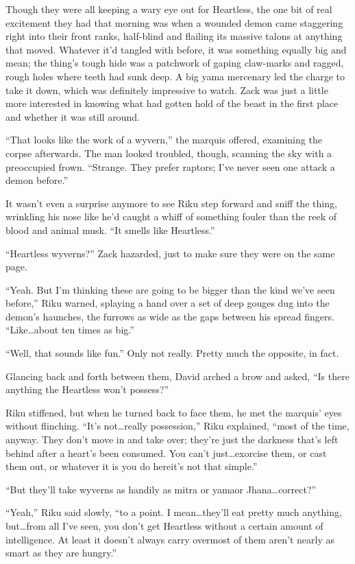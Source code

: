 Though they were all keeping a wary eye out for Heartless, the one bit of real excitement they had that morning was when a wounded demon came staggering right into their front ranks, half-blind and flailing its massive talons at anything that moved. Whatever it'd tangled with before, it was something equally big and mean; the thing's tough hide was a patchwork of gaping claw-marks and ragged, rough holes where teeth had sunk deep. A big yama mercenary led the charge to take it down, which was definitely impressive to watch. Zack was just a little more interested in knowing what had gotten hold of the beast in the first place and whether it was still around.

``That looks like the work of a wyvern,'' the marquis offered, examining the corpse afterwards. The man looked troubled, though, scanning the sky with a preoccupied frown. ``Strange. They prefer raptors; I've never seen one attack a demon before.''

It wasn't even a surprise anymore to see Riku step forward and sniff the thing, wrinkling his nose like he'd caught a whiff of something fouler than the reek of blood and animal musk. ``It smells like Heartless.''

``Heartless wyverns?'' Zack hazarded, just to make sure they were on the same page.

``Yeah. But I'm thinking these are going to be bigger than the kind we've seen before,'' Riku warned, splaying a hand over a set of deep gouges dug into the demon's haunches, the furrows as wide as the gaps between his spread fingers. ``Like\ldots about ten times as big.''

``Well, that sounds like fun.'' Only not really. Pretty much the opposite, in fact.

Glancing back and forth between them, David arched a brow and asked, ``Is there anything the Heartless won't possess?''

Riku stiffened, but when he turned back to face them, he met the marquis' eyes without flinching. ``It's not\ldots really possession,'' Riku explained, ``most of the time, anyway. They don't move in and take over; they're just the darkness that's left behind after a heart's been consumed. You can't just\ldots exorcise them, or cast them out, or whatever it is you do here\textemdash it's not that simple.''

``But they'll take wyverns as handily as mitra or yama\textemdash or Jhana\ldots correct?''

``Yeah,'' Riku said slowly, ``to a point. I mean\ldots they'll eat pretty much anything, but\ldots from all I've seen, you don't get Heartless without a certain amount of intelligence. At least it doesn't always carry over\textemdash most of them aren't nearly as smart as they are hungry.''

